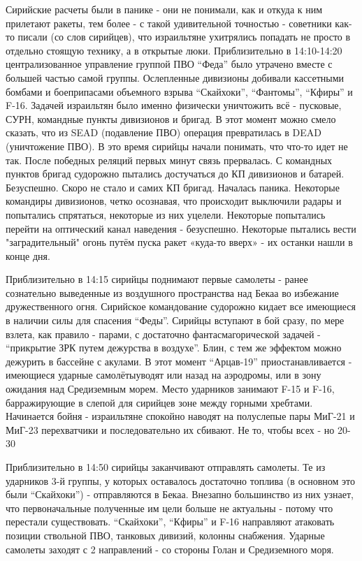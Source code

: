 Сирийские расчеты были в панике - они не понимали, как и откуда к ним прилетают ракеты, тем более - с такой удивительной точностью - советники как-то писали (со слов сирийцев), что израильтяне ухитрялись попадать не просто в отдельно стоящую технику, а в открытые люки.
Приблизительно в 14:10-14:20 централизованное управление группой ПВО “Феда” было утрачено вместе с большей частью самой группы. Ослепленные дивизионы добивали кассетными бомбами и боеприпасами объемного взрыва “Скайхоки”, “Фантомы”, “Кфиры” и F-16. Задачей израильтян было именно физически уничтожить всё - пусковые, СУРН, командные пункты дивизионов и бригад. В этот момент можно смело сказать, что из SEAD (подавление ПВО) операция превратилась в DEAD (уничтожение ПВО). В это время сирийцы начали понимать, что что-то идет не так. После победных реляций первых минут связь прервалась. С командных пунктов бригад судорожно пытались достучаться до КП дивизионов и батарей. Безуспешно. Скоро не стало и самих КП бригад. Началась паника. Некоторые командиры дивизионов, четко осознавая, что происходит выключили радары и попытались спрятаться, некоторые из них уцелели. Некоторые попытались перейти на оптический канал наведения - безуспешно. Некоторые пытались вести "заградительный" огонь путём пуска ракет «куда-то вверх» - их останки нашли в конце дня.

Приблизительно в 14:15 сирийцы поднимают первые самолеты - ранее сознательно выведенные из воздушного пространства над Бекаа во избежание дружественного огня. Сирийское командование судорожно кидает все имеющиеся в наличии силы для спасения “Феды”. Сирийцы вступают в бой сразу, по мере взлета, как правило - парами, с достаточно фантасмагорической задачей - “прикрытие ЗРК путем дежурства в воздухе”. Блин, с тем же эффектом можно дежурить в бассейне с акулами. В этот момент “Арцав-19” приостанавливается - имеющиеся ударные самолётыуводят или назад на аэродромы, или в зону ожидания над Средиземным морем. Место ударников занимают F-15 и F-16, барражирующие в слепой для сирийцев зоне между горными хребтами. Начинается бойня - израильтяне спокойно наводят на полуслепые пары МиГ-21 и МиГ-23 перехватчики и последовательно их сбивают. Не то, чтобы всех - но 20-30%

Приблизительно в 14:50 сирийцы заканчивают отправлять самолеты. Те из ударников 3-й группы, у которых оставалось достаточно топлива (в основном это были “Скайхоки”) - отправляются в Бекаа. Внезапно большинство из них узнает, что первоначальные полученные им цели больше не актуальны - потому что перестали существовать. “Скайхоки”, “Кфиры” и F-16 направляют атаковать позиции ствольной ПВО, танковых дивизий, колонны снабжения. Ударные самолеты заходят с 2 направлений - со стороны Голан и Средиземного моря.


